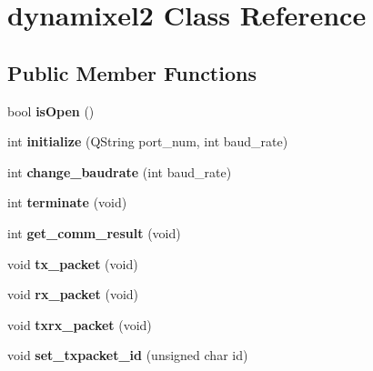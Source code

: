 \hypertarget{classdynamixel2}{}\section{dynamixel2 Class Reference}
\label{classdynamixel2}
\subsection*{Public Member Functions}
\begin{DoxyCompactItemize}
\item 
\hypertarget{classdynamixel2_a3a93b1220d71166f282ef5f2d8307dbe}{}bool {\bfseries is\+Open} ()\label{classdynamixel2_a3a93b1220d71166f282ef5f2d8307dbe}

\item 
\hypertarget{classdynamixel2_aa2c59aef6a9f1adf7df3bf43c8b255a2}{}int {\bfseries initialize} (Q\+String port\+\_\+num, int baud\+\_\+rate)\label{classdynamixel2_aa2c59aef6a9f1adf7df3bf43c8b255a2}

\item 
\hypertarget{classdynamixel2_ad0cef34ebfdd57ba0110e7c3623d7aa6}{}int {\bfseries change\+\_\+baudrate} (int baud\+\_\+rate)\label{classdynamixel2_ad0cef34ebfdd57ba0110e7c3623d7aa6}

\item 
\hypertarget{classdynamixel2_a84d998585aab4e92413220ca5b489a0a}{}int {\bfseries terminate} (void)\label{classdynamixel2_a84d998585aab4e92413220ca5b489a0a}

\item 
\hypertarget{classdynamixel2_a46f02d077a26dae6e8e52df6d89f035a}{}int {\bfseries get\+\_\+comm\+\_\+result} (void)\label{classdynamixel2_a46f02d077a26dae6e8e52df6d89f035a}

\item 
\hypertarget{classdynamixel2_a526e395e15fbf50ffbc8ce0853b08233}{}void {\bfseries tx\+\_\+packet} (void)\label{classdynamixel2_a526e395e15fbf50ffbc8ce0853b08233}

\item 
\hypertarget{classdynamixel2_a7ca03821f030981263c55f2ae2786c4c}{}void {\bfseries rx\+\_\+packet} (void)\label{classdynamixel2_a7ca03821f030981263c55f2ae2786c4c}

\item 
\hypertarget{classdynamixel2_a2cccd455a52afe99a37b249aa834cdc7}{}void {\bfseries txrx\+\_\+packet} (void)\label{classdynamixel2_a2cccd455a52afe99a37b249aa834cdc7}

\item 
\hypertarget{classdynamixel2_a78e147772e166a87d8e64656843d9e37}{}void {\bfseries set\+\_\+txpacket\+\_\+id} (unsigned char id)\label{classdynamixel2_a78e147772e166a87d8e64656843d9e37}


\end{DoxyCompactItemize}
